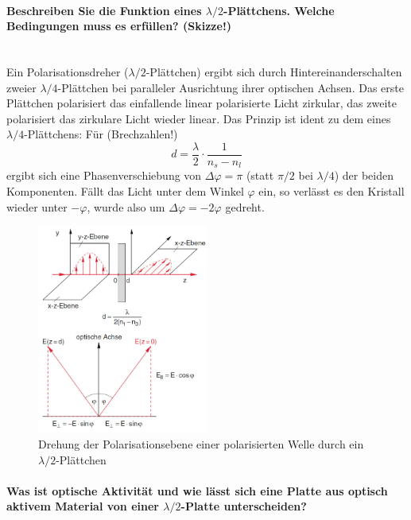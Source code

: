 \documentclass[a4paper, 11pt, ngerman, parskip=half-]{scrartcl}
\begin{document}
\paragraph{Beschreiben Sie die Funktion eines $\lambda/2$-Plättchens. Welche Bedingungen muss es erfüllen? (Skizze!)}~\\

Ein Polarisationsdreher ($\lambda/2$-Plättchen) ergibt sich durch Hintereinanderschalten zweier $\lambda/4$-Plättchen bei paralleler
Ausrichtung ihrer optischen Achsen. Das erste Plättchen polarisiert das einfallende linear polarisierte Licht zirkular, das zweite
polarisiert das zirkulare Licht wieder linear. Das Prinzip ist ident zu dem eines $\lambda/4$-Plättchens: Für (Brechzahlen!)
%
\[d = \frac{\lambda}{2} \cdot \frac{1}{n_s - n_l}\]
%
ergibt sich eine Phasenverschiebung von $\Delta \varphi = \pi$ (statt $\pi/2$ bei $\lambda/4$) der beiden Komponenten. Fällt das
Licht unter dem Winkel $\varphi$ ein, so verlässt es den Kristall wieder unter $-\varphi$, wurde also um $\Delta \varphi = -2 \varphi$ gedreht.
%
\begin{figure}[!h]
    \centering
    \begin{samepage}
        \includegraphics[width=0.5\textwidth]{image/15/lambda_halbe_3.png}
        \caption{Drehung der Polarisationsebene einer polarisierten
            Welle durch ein $\lambda/2$-Plättchen}
        \label{fig:lambda_halbe}
    \end{samepage}
\end{figure}
%
\paragraph{Was ist optische Aktivität und wie lässt sich eine Platte aus optisch aktivem Material von einer $\lambda/2$-Platte unterscheiden?}~\\
\end{document}
